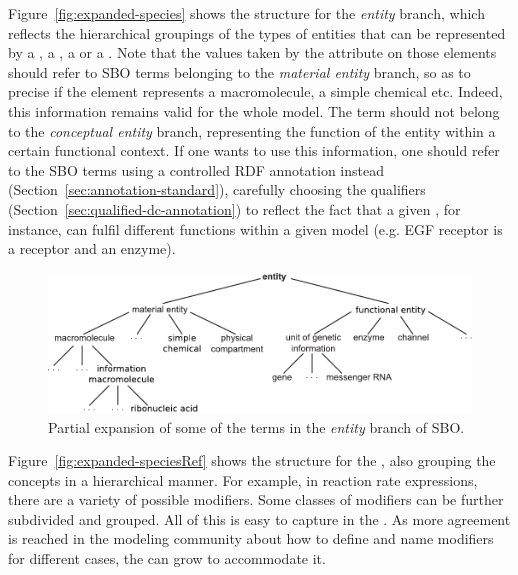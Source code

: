 \begin{blockChanged}

Figure~\vref{fig:expanded-species} shows the structure for the \emph{entity} branch, which reflects the hierarchical groupings of the types of entities that can be represented by a , a , a  or a . Note that the values taken by the  attribute on those elements should refer to SBO terms belonging to the \emph{material entity} branch, so as to precise if the element represents a macromolecule, a simple chemical etc. Indeed, this information remains valid for the whole model. The term should not belong to the \emph{conceptual entity} branch, representing the function of the entity within a certain functional context. If one wants to use this information, one should refer to the SBO terms using a controlled RDF annotation instead (Section~\ref{sec:annotation-standard}), carefully choosing the qualifiers (Section~\ref{sec:qualified-dc-annotation}) to reflect the fact that a given , for instance, can fulfil different functions within a given model (e.g. EGF receptor is a receptor and an enzyme).

\end{blockChanged}

\begin{figure}[htb]
  \vspace*{1ex}
  \centering
  \includegraphics[scale = 0.8]{figs/sbo-entity}
  \caption{Partial expansion of some of the terms in the
    \emph{entity} branch of SBO.}
  \label{fig:expanded-species}
\end{figure}

\begin{blockChanged}

Figure~\vref{fig:expanded-speciesRef} shows the structure
for the , also grouping the concepts in a hierarchical manner. For example, in reaction
rate expressions, there are a variety of possible modifiers.  Some
classes of modifiers can be further subdivided and grouped.  All
of this is easy to capture in the .  As more agreement is
reached in the modeling community about how to define and name
modifiers for different cases, the  can grow to accommodate it.

\end{blockChanged}


